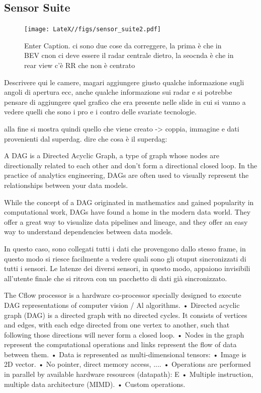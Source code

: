 \subsection{Sensor Suite}

\begin{figure}
    \centering
    \texttt{[image: LateX//figs/sensor\_suite2.pdf]}
    \caption{Enter Caption. ci sono due cose da correggere, la prima è che in BEV cnon ci deve essere il radar centrale dietro, la seocnda è che in rear view c'è RR che non è centrato}
    \label{fig:enter-label}
\end{figure}


Descrivere qui le camere, magari aggiungere giusto qualche informazione sugli angoli di apertura ecc, anche qualche informazione sui radar e si potrebbe pensare di aggiungere quel grafico che era presente nelle slide in cui si vanno a vedere quelli che sono i pro e i contro delle svariate tecnologie. 

alla fine si mostra quindi quello che viene creato -> coppia, immagine e dati provenienti dal superdag. 
dire che cosa è il superdag: 




A DAG is a Directed Acyclic Graph, a type of graph whose nodes are directionally related to each other and don’t form a directional closed loop. In the practice of analytics engineering, DAGs are often used to visually represent the relationships between your data models.

While the concept of a DAG originated in mathematics and gained popularity in computational work, DAGs have found a home in the modern data world. They offer a great way to visualize data pipelines and lineage, and they offer an easy way to understand dependencies between data models.

In questo caso, sono collegati tutti i dati che provengono dallo stesso frame, in questo modo si riesce facilmente a vedere quali sono gli otuput sincronizzati di tutti i sensori. Le latenze dei diversi sensori, in questo modo, appaiono invisibili all'utente finale che si ritrova con un pacchetto di dati già sincronizzato. 


The Cflow processor is a hardware co-processor specially designed to execute
DAG representations of computer vision / Al algorithms.
• Directed acyclic graph (DAG) is a directed graph with no directed cycles. It consists of vertices and edges, with each edge directed from one vertex to another, such that following those directions will never form a closed loop.
• Nodes in the graph represent the computational operations and links represent the flow of data between them.
• Data is represented as multi-dimensional tensors:
• Image is 2D vector.
• No pointer, direct memory access, ....
• Operations are performed in parallel by available hardware resources (datapath):
E
• Multiple instruction, multiple data architecture (MIMD).
• Custom operations.

